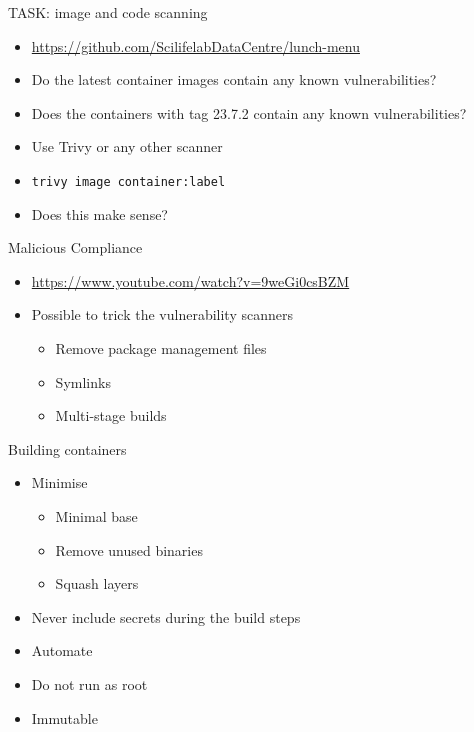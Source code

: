 \documentclass{dcpresentation}
\begin{document}
\begin{frame}{TASK: image and code scanning}
  \begin{itemize}
  \item \url{https://github.com/ScilifelabDataCentre/lunch-menu}
  \item Do the latest container images contain any known vulnerabilities?
  \item Does the containers with tag 23.7.2 contain any known vulnerabilities?
  \item Use Trivy or any other scanner
  \item \texttt{trivy image container:label}
  \item Does this make sense?
  \end{itemize}
\end{frame}


\begin{frame}{Malicious Compliance}
  \begin{itemize}
  \item \url{https://www.youtube.com/watch?v=9weGi0csBZM}
  \item Possible to trick the vulnerability scanners
  \begin{itemize}
  \item Remove package management files
  \item Symlinks
  \item Multi-stage builds
  \end{itemize} 
  \end{itemize}  
\end{frame}


\begin{frame}{Building containers}
 \begin{itemize}
  \item Minimise
  \begin{itemize}
   \item Minimal base %
   \item Remove unused binaries
   \item Squash layers %
  \end{itemize}
  \item Never include secrets during the build steps
  \item Automate
  \item Do not run as root
  \item Immutable
 \end{itemize}
\end{frame}
\end{document}
